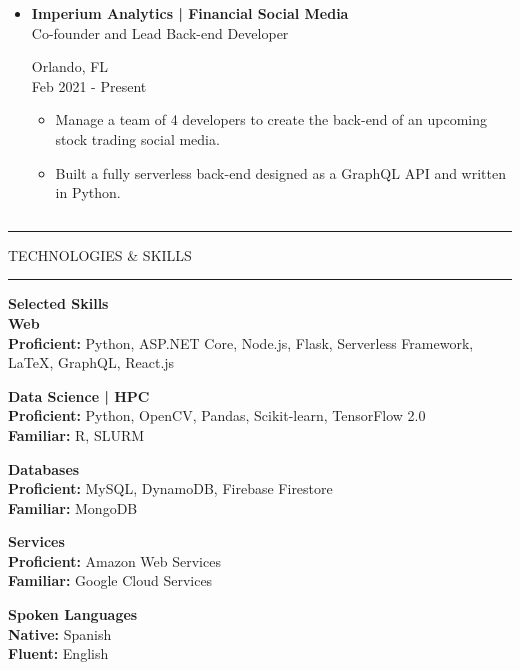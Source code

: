 \documentclass{article}
\newcommand{\makeminipage}[4]{
    \begin{minipage}[c]{.7\linewidth} 
        \flushleft #1 \\ #2
    \end{minipage} \hfill
    \begin{minipage}[c]{.29\linewidth}
        \flushright #3 \\ #4
    \end{minipage}
}
\newcommand{\makesection}[1]{\hrule\vskip1mm\uppercase{#1}\vskip1mm\hrule}
\begin{document}
\begin{minipage}[t]{.69\linewidth}
\begin{itemize}[leftmargin=.35cm]
        \item \makeminipage
            {\textbf{Imperium Analytics | Financial Social Media}}
            {Co-founder and Lead Back-end Developer}
            {Orlando, FL}
            {Feb 2021 - Present}
            \vspace*{-1.5mm}
            \begin{itemize}[leftmargin=.35cm]
                \item Manage a team of 4 developers to create the back-end of an upcoming stock trading social media.
                \item Built a fully serverless back-end designed as a GraphQL API and written in Python.
            \end{itemize}
    \end{itemize}
\end{minipage}
\begin{minipage}[t]{.01\linewidth}$ $\end{minipage}
\begin{minipage}[t]{.29\linewidth}
    \makesection{Technologies \& Skills}
    \vspace*{3.75mm}

    \textbf{Selected Skills} \\
    \textbf{Web} \\
    \textbf{Proficient:} Python, ASP.NET Core, Node.js, Flask, Serverless Framework, \LaTeX, GraphQL, React.js
    \vspace*{2mm}

    \textbf{Data Science | HPC} \\
    \textbf{Proficient:} Python, OpenCV, Pandas, Scikit-learn, TensorFlow 2.0 \\
    \textbf{Familiar:} R, SLURM
    \vspace*{2mm}
    
    \textbf{Databases} \\
    \textbf{Proficient:} MySQL, DynamoDB, Firebase Firestore \\
    \textbf{Familiar:} MongoDB
    \vspace*{2mm}

    \textbf{Services} \\
    \textbf{Proficient:} Amazon Web Services \\
    \textbf{Familiar:} Google Cloud Services
    \vspace*{2mm}

    \textbf{Spoken Languages} \\
    \textbf{Native:} Spanish \\
    \textbf{Fluent:} English
\end{minipage}
\vspace*{2.5mm}
\end{document}
